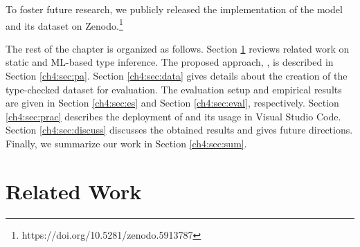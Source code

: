 To foster future research, we publicly released the implementation of the \name model and its dataset on Zenodo.\footnote{https://doi.org/10.5281/zenodo.5913787}

The rest of the chapter is organized as follows. Section \ref{ch4:sec:rw} reviews related work on static and ML-based type inference. The proposed approach, \name, is described in Section \ref{ch4:sec:pa}. Section \ref{ch4:sec:data} gives details about the creation of the type-checked dataset for evaluation. The evaluation setup and empirical results are given in Section \ref{ch4:sec:es} and Section \ref{ch4:sec:eval}, respectively. Section \ref{ch4:sec:prac} describes the deployment of \name and its usage in Visual Studio Code. Section \ref{ch4:sec:discuss} discusses the obtained results and gives future directions. Finally, we summarize our work in Section \ref{ch4:sec:sum}.

\newpage

\section{Related Work}\label{ch4:sec:rw}

